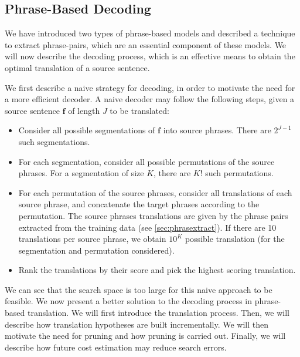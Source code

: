 \subsection{Phrase-Based Decoding}
\label{sec:phraseBasedDecoding}


We have introduced two types of phrase-based
models and described a technique to extract
phrase-pairs, which are an essential component
of these models. We will now describe the decoding
process, which is an effective means to obtain
the optimal translation of a source sentence.

We first describe a naive strategy for decoding, in order
to motivate the need for a more efficient decoder.
A naive decoder may follow the following steps, given
a source sentence $\bm{f}$ of length $J$ to be translated:
%
\begin{itemize}
  \item Consider all possible segmentations of $\bm{f}$ into source phrases. There are $2^{J - 1}$ such segmentations.
  \item For each segmentation, consider all possible permutations of the source phrases. For a segmentation of size $K$, there are $K!$ such permutations.
  \item For each permutation of the source phrases, consider all translations of each source phrase, and concatenate the target
    phrases according to the permutation. The source phrases translations are given by the phrase pairs extracted from the training
    data (see \autoref{sec:phrasextract}). If there are 10 translations per source phrase, we obtain
    $10^K$ possible translation (for the segmentation and permutation considered).
  \item Rank the translations by their score and pick the highest scoring translation.
\end{itemize}
%
We can see that the search space is too large for this naive
approach to be feasible.
We now present a better solution to the decoding process in phrase-based translation.
We will first introduce the translation process. Then, we will
describe how translation hypotheses are built incrementally.
We will then motivate the need for pruning and how pruning
is carried out. Finally, we will describe how future cost estimation
may reduce search errors.

